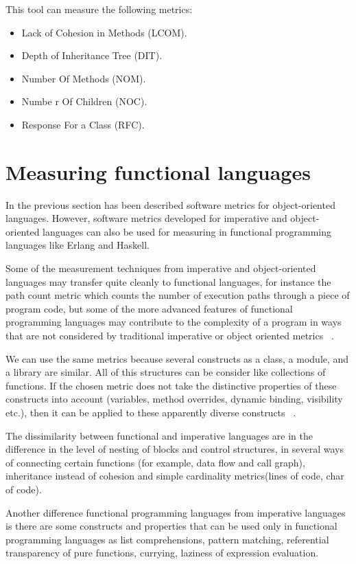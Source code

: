 This tool can measure the following metrics:
\begin{itemize}
	\item Lack of Cohesion in Methods (LCOM).
	\item Depth of Inheritance Tree (DIT).
	\item Number Of Methods (NOM).
	\item Numbe r Of Children (NOC).
	\item Response For a Class (RFC).
\end{itemize}

\section{Measuring functional languages}

In the previous section has been described software metrics for object-oriented languages. However, software metrics developed for imperative and object-oriented languages can also be used for measuring in functional programming languages like Erlang and Haskell. 

Some  of  the  measurement  techniques  from  imperative  and object-oriented  languages  may  transfer  quite  cleanly  to  functional  languages,  for  instance  the  path  count  metric  which  counts  the  number  of  execution  paths through  a  piece  of  program  code,  but  some  of  the  more  advanced features  of  functional  programming  languages  may contribute  to  the  complexity  of  a  program  in  ways  that  are  not  considered  by  traditional  imperative  or  object  oriented 
metrics ~\cite{fp}. 

We can use the same metrics because several constructs as a class, a module, and a library are similar. All of this structures can be consider like collections of functions. If the chosen metric does not take the distinctive properties of these constructs into account (variables, method overrides, dynamic binding, visibility etc.), then it can be applied to these apparently diverse constructs ~\cite{metrics3}.

The dissimilarity between functional and imperative languages are in the difference in the level of nesting of blocks and control structures, in several ways of connecting certain functions (for example, data flow and call graph), inheritance instead of cohesion and simple cardinality metrics(lines of code, char of code).

Another difference functional programming languages from imperative languages is there are some constructs and properties that can be used only in functional programming languages as list comprehensions, pattern matching, referential transparency of pure functions, currying, laziness of expression evaluation.

